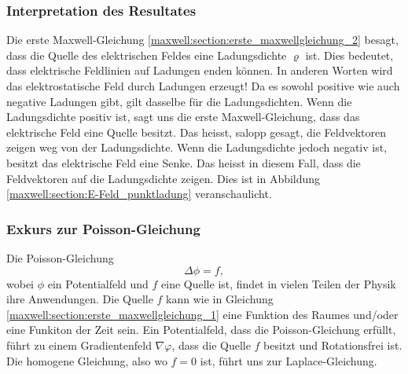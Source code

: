 \subsubsection{Interpretation des Resultates}
Die erste Maxwell-Gleichung \eqref{maxwell:section:erste_maxwellgleichung_2} besagt, dass die Quelle des elektrischen Feldes eine Ladungsdichte $\varrho$ ist.
Dies bedeutet, dass elektrische Feldlinien auf Ladungen enden können.
In anderen Worten wird das elektrostatische Feld durch Ladungen erzeugt!
Da es sowohl positive wie auch negative Ladungen gibt, gilt dasselbe für die Ladungsdichten.
Wenn die Ladungsdichte positiv ist, sagt uns die erste Maxwell-Gleichung, dass das elektrische Feld eine Quelle besitzt.
Das heisst, salopp gesagt, die Feldvektoren zeigen weg von der Ladungsdichte.
Wenn die Ladungsdichte jedoch negativ ist, besitzt das elektrische Feld eine Senke.
Das heisst in diesem Fall, dass die Feldvektoren auf die Ladungsdichte zeigen. Dies ist in Abbildung \ref{maxwell:section:E-Feld_punktladung} veranschaulicht.

\subsubsection{Exkurs zur Poisson-Gleichung}
Die Poisson-Gleichung
\[
\Delta\phi
=
f,
\]
wobei $\phi$ ein Potentialfeld und $f$ eine Quelle ist, findet in vielen Teilen der Physik ihre Anwendungen.
Die Quelle $f$ kann wie in Gleichung \eqref{maxwell:section:erste_maxwellgleichung_1} eine Funktion des Raumes und/oder eine Funkiton der Zeit sein.
Ein Potentialfeld, dass die Poisson-Gleichung erfüllt, führt zu einem Gradientenfeld $\nabla\varphi$, dass die Quelle $f$ besitzt und Rotationsfrei ist.
Die homogene Gleichung, also wo $f = 0$ ist, führt uns zur Laplace-Gleichung.







